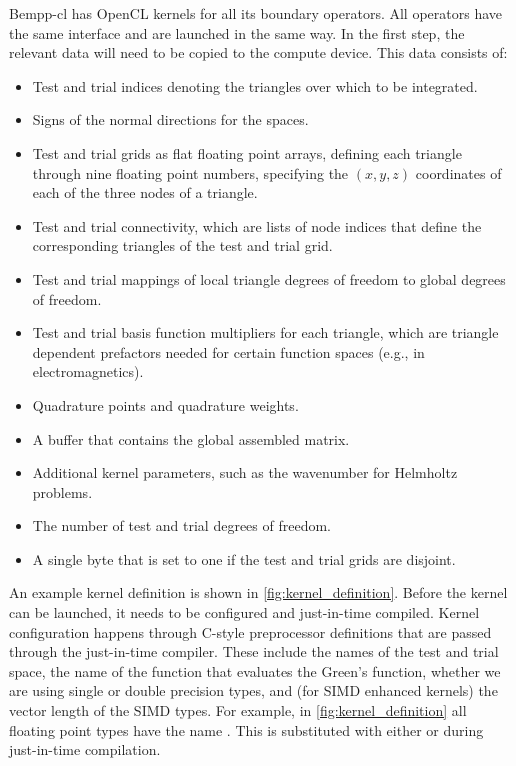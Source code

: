 \documentclass{IEEEcsmag}
\begin{document}
Bempp-cl has OpenCL kernels for all its boundary operators. All operators have the same interface and are launched in the same way. In the first step, the relevant data will need to be copied to the compute device. This data consists of:

\begin{itemize}
	\item Test and trial indices denoting the triangles over which to be integrated.
	\item Signs of the normal directions for the spaces.
	\item Test and trial grids as flat floating point arrays, defining each triangle through nine floating point numbers, specifying the $(x, y, z)$ coordinates of each of the three nodes of a triangle.
	\item Test and trial connectivity, which are lists of node indices that define the corresponding triangles of the test and trial grid.
	\item Test and trial mappings of local triangle degrees of freedom to global degrees of freedom.
	\item Test and trial basis function multipliers for each triangle, which are triangle dependent prefactors needed for certain function spaces (e.g., in electromagnetics).
	\item Quadrature points and quadrature weights.
	\item A buffer that contains the global assembled matrix.
	\item Additional kernel parameters, such as the wavenumber for Helmholtz problems.
	\item The number of test and trial degrees of freedom.
	\item A single byte that is set to one if the test and trial grids are disjoint.
\end{itemize}

An example kernel definition is shown in \cref{fig:kernel_definition}.
Before the kernel can be launched, it needs to be configured and just-in-time compiled. Kernel configuration happens through C-style preprocessor definitions that are passed through the just-in-time compiler. These include the names of the test and trial space, the name of the function that evaluates the Green's function, whether we are using single or double precision types, and (for SIMD enhanced kernels) the vector length of the SIMD types.
For example, in \cref{fig:kernel_definition} all floating point types have the name . This is substituted with either  or  during just-in-time compilation.
\end{document}
